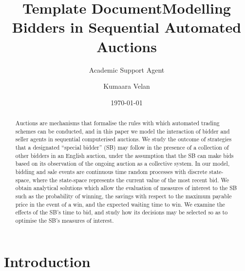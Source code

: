 \documentclass{article}
\title{Template Document}
\author{Academic Support Agent}
\date{\today}
\begin{document}
\maketitle

\title[Modelling Bidders in Sequential Automated Auctions]{Modelling Bidders in Sequential Automated Auctions}
\author{Kumaara Velan}
 

 




\begin{abstract}
Auctions are mechanisms that formalise the rules with which
automated trading schemes can be conducted, and in this paper we
model the interaction of bidder and seller agents in sequential
computerised auctions. We study the outcome of strategies that a
designated ``special bidder'' (SB) may follow in the presence of a
collection of other bidders in an English auction, under the
assumption that the SB can make bids based on its observation of
the ongoing auction as a collective system. In our model, bidding
and sale events are continuous time random processes with discrete
state-space, where the state-space represents the current value of
the most recent bid. We obtain analytical solutions which allow
the evaluation of measures of interest to the SB such as the
probability of winning, the savings with respect to the maximum
payable price in the event of a win, and the expected waiting time
to win. We examine the effects of the SB's time to bid, and study
how its decisions may be selected so as to optimise the SB's
measures of interest.
\end{abstract}

\maketitle


\section{Introduction}
\end{document}
